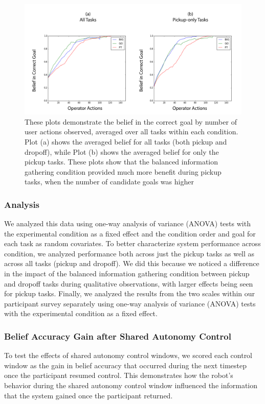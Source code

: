 \documentclass[conference]{IEEEtran}
\begin{document}
\begin{figure}
\includegraphics[width=\columnwidth]{figures/Graphs.pdf}
\caption{These plots demonstrate the belief in the correct goal by number of user actions observed, averaged over all tasks within each condition. Plot (a) shows the averaged belief for all tasks (both pickup and dropoff), while Plot (b) shows the averaged belief for only the pickup tasks. These plots show that the balanced information gathering condition provided much more benefit during pickup tasks, when the number of candidate goals was higher}
\label{belief_graphs}
\end{figure}

\subsubsection{Analysis}

We analyzed this data using one-way analysis of variance (ANOVA) tests with the experimental condition as a fixed effect and the condition order and goal for each task as random covariates. To better characterize system performance across condition, we analyzed performance both across just the pickup tasks as well as across all tasks (pickup and dropoff). We did this because we noticed a difference in the impact of the balanced information gathering condition between pickup and dropoff tasks during qualitative observations, with larger effects being seen for pickup tasks. Finally, we analyzed the results from the two scales within our participant survey separately using one-way analysis of variance (ANOVA) tests with the experimental condition as a fixed effect.

\subsubsection{Belief Accuracy Gain after Shared Autonomy Control}
To test the effects of shared autonomy control windows, we scored each control window as the gain in belief accuracy that occurred during the next timestep once the participant resumed control. This demonstrates how the robot's behavior during the shared autonomy control window influenced the information that the system gained once the participant returned.
\end{document}
